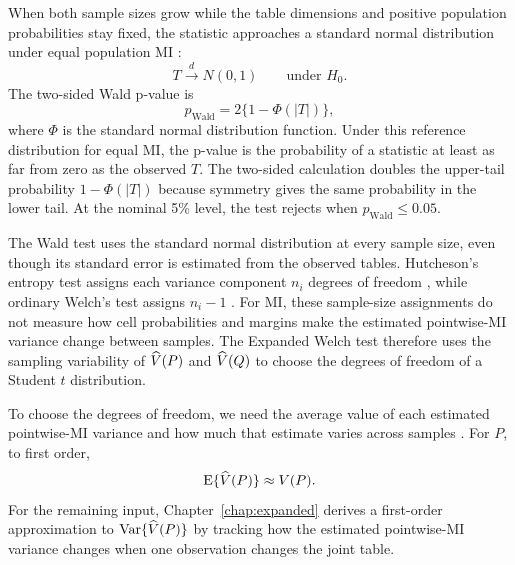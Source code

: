 When both sample sizes grow while the table dimensions and positive
population probabilities stay fixed, the statistic approaches a standard
normal distribution under equal population MI
\citep{wald1943,vanderVaart1998}:
\begin{equation}
  T\xrightarrow{d}N(0,1)
  \qquad\text{under }H_0.
\end{equation}
The two-sided Wald p-value is
\begin{equation}
  p_{\mathrm{Wald}}
  =2\{1-\Phi(|T|)\},
  \label{eq:wald-pvalue}
\end{equation}
where \(\Phi\) is the standard normal distribution function. Under this
reference distribution for equal MI, the p-value is the probability of a
statistic at least as far from zero as the observed \(T\). The
two-sided calculation doubles the upper-tail probability
\(1-\Phi(|T|)\) because symmetry gives the same probability in the
lower tail.
At the nominal 5\% level, the test rejects when \(p_{\mathrm{Wald}}\leq0.05\).

\medskip
{}

The Wald test uses the standard normal distribution at every sample size, even
though its standard error is estimated from the observed tables.
Hutcheson's entropy test assigns each variance component \(n_i\)
degrees of freedom \citep{hutcheson1970}, while ordinary Welch's test
assigns \(n_i-1\) \citep{welch1947}. For MI, these sample-size assignments
do not measure how cell probabilities and margins make the estimated
pointwise-MI variance change between samples. The Expanded Welch test therefore
uses the sampling variability of \(\widehat V(P)\) and \(\widehat V(Q)\) to choose
the degrees of freedom of a Student \(t\) distribution.

To choose the degrees of freedom, we need the average value of each estimated
pointwise-MI variance and how much that estimate varies across samples
\citep{satterthwaite1946}. For \(P\), to first order,
\begin{equation}
  \operatorname{E}\{\widehat V(P)\}\approx V(P).
\end{equation}
For the remaining input, Chapter~\ref{chap:expanded} derives a first-order
approximation to \(\operatorname{Var}\{\widehat V(P)\}\) by tracking how the estimated
pointwise-MI variance changes when one observation changes the joint table.
